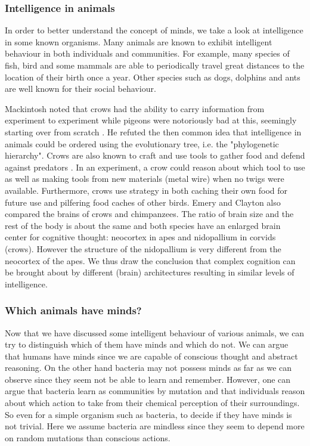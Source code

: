 \documentclass[11pt]{article}
\begin{document}
\subsubsection*{Intelligence in animals}

In order to better understand the concept of minds, we take a look at intelligence in some known organisms. 
Many animals are known to exhibit intelligent behaviour in both individuals and communities. For example, many species of fish, bird and some mammals are able to periodically travel great distances to the location of their birth once a year. Other species such as dogs, dolphins and ants are well known for their social behaviour.

Mackintosh noted that crows had the ability to carry information from experiment to experiment while pigeons were notoriously bad at this, seemingly starting over from scratch \cite{mackintosh1988animals}. He refuted the then common idea that intelligence in animals could be ordered using the evolutionary tree, i.e. the "phylogenetic hierarchy". 
Crows are also known to craft and use tools to gather food and defend against predators \cite{emery2004crows}. In an experiment, a crow could reason about which tool to use as well as making tools from new materials (metal wire) when no twigs were available.
Furthermore, crows use strategy in both caching their own food for future use and pilfering food caches of other birds. 
Emery and Clayton also compared the brains of crows and chimpanzees.
The ratio of brain size and the rest of the body is about the same and both species have an enlarged brain center for cognitive thought: neocortex in apes and nidopallium in corvids (crows). However the structure of the nidopallium is very different from the neocortex of the apes. We thus draw the conclusion that complex cognition can be brought about by different (brain) architectures resulting in similar levels of intelligence.

\subsubsection*{Which animals have minds?}

Now that we have discussed some intelligent behaviour of various animals, we can try to distinguish which of them have minds and which do not. We can argue that humans have minds since we are capable of conscious thought and abstract reasoning. On the other hand bacteria may not possess minds as far as we can observe since they seem not be able to learn and remember. However, one can argue that bacteria learn as communities by mutation and that individuals reason about which action to take from their chemical perception of their surroundings. So even for a simple organism such as bacteria, to decide if they have minds is not trivial. Here we assume bacteria are mindless since they seem to depend more on random mutations than conscious actions.
\end{document}
